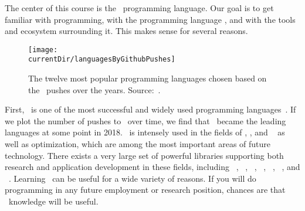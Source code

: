 %
%
The center of this course is the \python\ programming language.
Our goal is to get familiar with programming, with the programming language \python, and with the tools and ecosystem surrounding it.
This makes sense for several reasons.

\begin{figure}%
\centering%
\texttt{[image: \\currentDir/languagesByGithubPushes]}%
\caption{The twelve most popular programming languages chosen based on the \github\ pushes over the years. Source:~\cite{B2023G2GLS}.}%
\label{fig:languagesByGithubPushes}%
\end{figure}%
%
First, \python\ is one of the most successful and widely used programming languages~\cite{CBST2024LOHPPTDDSAMLA}.
If we plot the number of pushes to \github\ over time, we find that \python\ became the leading languages at some point in 2018.
\python\ is intensely used in the fields of , , and ~\cite{CBST2024LOHPPTDDSAMLA} as well as optimization, which are among the most important areas of future technology.
There exists a very large set of powerful libraries supporting both research and application development in these fields, including \numpy~\cite{HMvdWGVCWTBSKPHvKBHFdRWPGMSRWAGO2020APWN}, \pandas~\cite{B2012DPWP}, \scikitlearn~\cite{PVGMTGBPWDVPCBPD2011SMLIP}, \scipy~\cite{VGOHRCBPWBvdWBWMMNJKLCPFMVLPCHQHARPvMS2020SFAFSCIP}, \tensorflow~\cite{ABCCDDDGIIKLMMMSTVWWYZ2016TASFLSML}, \matplotlib~\cite{H2007MA2GE}, and \moptipy~\cite{WW2023RSDEWASSAA}.
Learning \python\ can be useful for a wide variety of reasons.
If you will do programming in any future employment or research position, chances are that \python\ knowledge will be useful.%
%
\endhsection%
%
